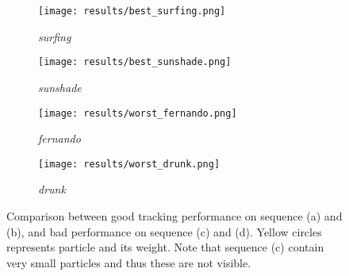 \documentclass[runningheads]{llncs}
\begin{document}
\begin{figure}
    \centering

    \begin{subfigure}{0.23\textwidth}
        \texttt{[image: results/best\_surfing.png]}
        \caption{\textit{surfing}}
    \end{subfigure}
    \hspace*{\fill}
    \begin{subfigure}{0.23\textwidth}
        \texttt{[image: results/best\_sunshade.png]}
        \caption{\textit{sunshade}}
    \end{subfigure}
    \hspace*{\fill}
    \begin{subfigure}{0.23\textwidth}
        \texttt{[image: results/worst\_fernando.png]}
        \caption{\textit{fernando}}
    \end{subfigure}
    \hspace*{\fill}
    \begin{subfigure}{0.23\textwidth}
        \texttt{[image: results/worst\_drunk.png]}
        \caption{\textit{drunk}}
    \end{subfigure}

    \caption{Comparison between good tracking performance on sequence (a) and (b), and bad performance on sequence (c) and (d). Yellow circles represents particle and its weight. Note that sequence (c) contain very small particles and thus these are not visible.}
    \label{img_tracker_best_worst}
\end{figure}
\end{document}
